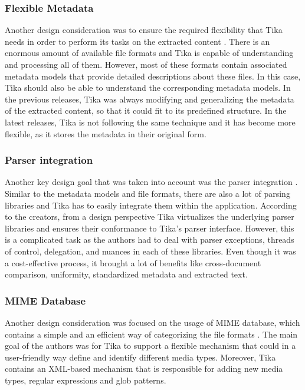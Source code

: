 \documentclass{article}
\begin{document}
\subsubsection{Flexible Metadata}
Another design consideration was to ensure the required flexibility that Tika needs in order to perform its tasks on the extracted content \citep{tika_in_action}. There is an enormous amount of available file formats and Tika is capable of understanding and processing all of them. However, most of these formats contain associated metadata models that provide detailed descriptions about these files. In this case, Tika should also be able to understand the corresponding metadata models. In the previous releases, Tika was always modifying and generalizing the metadata of the extracted content, so that it could fit to its predefined structure. In the latest releases, Tika is not following the same technique and it has become more flexible, as it stores the metadata in their original form.

\subsubsection{Parser integration}
Another key design goal that was taken into account was the parser integration \citep{tika_in_action}. Similar to the metadata models and file formats, there are also a lot of parsing libraries and Tika has to easily integrate them within the application. According to the creators, from a design perspective Tika virtualizes the underlying parser libraries and ensures their conformance to Tika’s parser interface. However, this is a complicated task as the authors had to deal with parser exceptions, threads of control, delegation, and nuances in each of these libraries. Even though it was a cost-effective process, it brought a lot of benefits like cross-document comparison, uniformity, standardized metadata and extracted text.

\subsubsection{MIME Database}
Another design consideration was focused on the usage of MIME database, which contains a simple and an efficient way of categorizing the file formats \citep{tika_in_action}. The main goal of the authors was for Tika to support a flexible mechanism that could in a user-friendly way define and identify different media types. Moreover, Tika contains an XML-based mechanism that is responsible for adding new media types, regular expressions and glob patterns.
\end{document}
